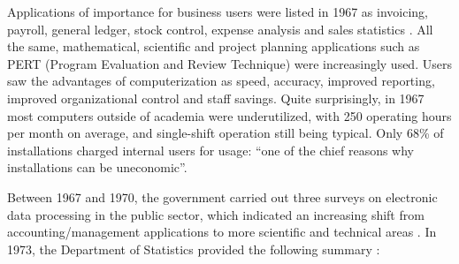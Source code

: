 \documentclass{IEEEcsmag}
\begin{document}
Applications of importance for business users were listed in 1967 as invoicing, payroll, general ledger, stock control, expense analysis and sales statistics \cite{ScottSurvey1967}. All the same, mathematical, scientific and project planning applications such as PERT (Program Evaluation and Review Technique) were increasingly used. Users saw the advantages of computerization as speed, accuracy, improved reporting, improved organizational control and staff savings. Quite surprisingly, in 1967 most computers outside of academia were underutilized, with 250 operating hours per month on average, and single-shift operation still being typical. Only 68\% of installations charged internal users for usage: “one of the chief reasons why installations can be uneconomic”.

Between 1967 and 1970, the government carried out three surveys on electronic data processing in the public sector, which indicated an increasing shift from accounting/management applications to more scientific and technical areas \cite{Lythgoe-1970}. 
In 1973, the Department of Statistics provided the following summary \cite{Yearbook73}:

\begin{quotation}
\end{quotation}

\end{document}

